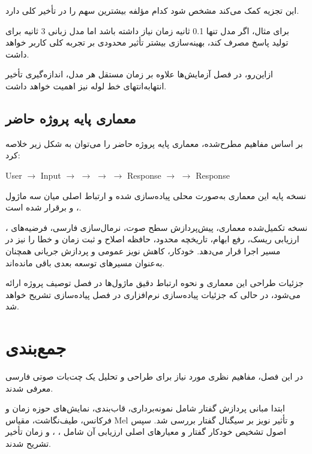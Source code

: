 این تجزیه کمک می‌کند مشخص شود کدام مؤلفه بیشترین سهم را در
تأخیر کلی دارد.

برای مثال، اگر مدل  تنها 0.1 ثانیه زمان نیاز داشته باشد
اما مدل زبانی 3 ثانیه برای تولید پاسخ مصرف کند، بهینه‌سازی
بیشتر  تأثیر محدودی بر تجربه کلی کاربر خواهد داشت.

ازاین‌رو، در فصل آزمایش‌ها علاوه بر زمان مستقل هر مدل،
اندازه‌گیری تأخیر انتهابه‌انتهای خط لوله نیز اهمیت خواهد داشت.


\subsection{معماری پایه پروژه حاضر}

بر اساس مفاهیم مطرح‌شده، معماری پایه پروژه حاضر را می‌توان
به شکل زیر خلاصه کرد:

\begin{center}
User 
$\longrightarrow$
 Input
$\longrightarrow$
$\longrightarrow$
$\longrightarrow$
$\longrightarrow$
Response 
$\longrightarrow$
$\longrightarrow$
Response 
\end{center}

نسخه پایه این معماری به‌صورت محلی پیاده‌سازی شده و ارتباط
اصلی میان سه ماژول
،  و 
برقرار شده است.

نسخه تکمیل‌شده معماری، پیش‌پردازش سطح صوت، نرمال‌سازی فارسی،
فرضیه‌های ، ارزیابی ریسک، رفع ابهام، تاریخچه محدود،
حافظه اصلاح و ثبت زمان و خطا را نیز در مسیر اجرا قرار می‌دهد.
 خودکار، کاهش نویز عمومی و پردازش جریانی همچنان به‌عنوان
مسیرهای توسعه بعدی باقی مانده‌اند.

جزئیات طراحی این معماری و نحوه ارتباط دقیق ماژول‌ها در
فصل توصیف پروژه ارائه می‌شود، در حالی که جزئیات پیاده‌سازی
نرم‌افزاری در فصل پیاده‌سازی تشریح خواهد شد.
\section{جمع‌بندی}

در این فصل، مفاهیم نظری مورد نیاز برای طراحی و تحلیل یک
چت‌بات صوتی فارسی معرفی شدند.

ابتدا مبانی پردازش گفتار شامل نمونه‌برداری، قاب‌بندی،
نمایش‌های حوزه زمان و فرکانس، طیف‌نگاشت، مقیاس Mel و تأثیر
نویز بر سیگنال گفتار بررسی شد.
سپس اصول تشخیص خودکار گفتار و معیارهای اصلی ارزیابی آن شامل
، ،  و زمان تأخیر تشریح شدند.

